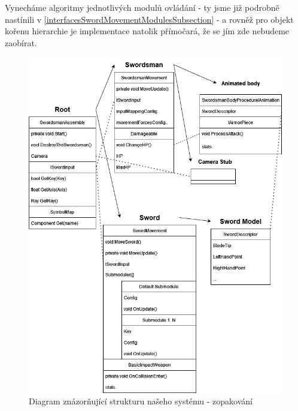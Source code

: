 Vynecháme algoritmy jednotlivých modulů ovládání - ty jsme již podrobně nastínili v \ref{interfacesSwordMovementModulesSubsection} - a rovněž pro objekt kořenu hierarchie je implementace natolik přímočará, že se jím zde nebudeme zaobírat. 


\begin{figure}[p]\centering
  \center
  \includegraphics[width=145mm]{../img/Structure-diagram.png}
  \caption{Diagram znázorňující strukturu našeho systému - zopakování}
  \label{obr05:objectModelDiagramReprise}
\end{figure} 

\pagebreak



